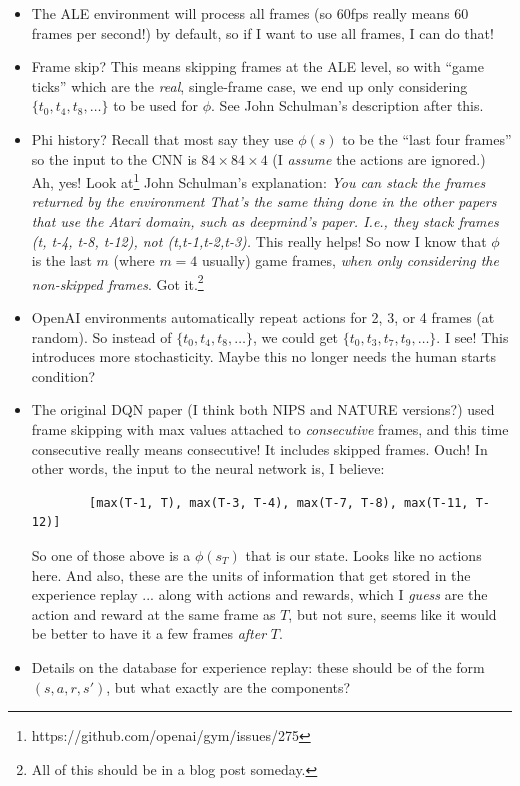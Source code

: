 \documentclass[letterpaper, 10pt, conference]{ieeeconf}
\begin{document}
    \begin{itemize}
        \item The ALE environment will process all frames (so 60fps really means
        60 frames per second!) by default, so if I want to use all frames, I can
        do that!

        \item Frame skip? This means skipping frames at the ALE level, so with
        ``game ticks'' which are the \emph{real}, single-frame case, we end up
        only considering $\{t_0, t_4, t_8, \ldots \}$ to be used for $\phi$. See
        John Schulman's description after this.

        \item Phi history? Recall that most say they use $\phi(s)$ to be the
        ``last four frames'' so the input to the CNN is $84 \times 84 \times 4$
        (I \emph{assume} the actions are ignored.) Ah, yes! Look
        at\footnote{https://github.com/openai/gym/issues/275} John
        Schulman's explanation: \emph{You can stack the frames returned by the
        environment That's the same thing done in the other papers that use the
        Atari domain, such as deepmind's paper.  I.e., they stack frames (t,
        t-4, t-8, t-12), not (t,t-1,t-2,t-3).} This really helps! So now I know
        that $\phi$ is the last $m$ (where $m=4$ usually) game frames,
        \emph{when only considering the non-skipped frames}. Got
        it.\footnote{All of this should be in a blog post someday.}

        \item OpenAI environments automatically repeat actions for 2, 3, or 4
        frames (at random). So instead of $\{t_0,t_4,t_8,\ldots\}$, we could get
        $\{t_0,t_3,t_7,t_9,\ldots\}$. I see! This introduces more stochasticity.
        Maybe this no longer needs the human starts condition?

        \item The original DQN paper (I think both NIPS and NATURE versions?)
        used frame skipping with max values attached to \emph{consecutive}
        frames, and this time consecutive really means consecutive! It includes
        skipped frames. Ouch! In other words, the input to the neural network
        is, I believe:
        \begin{verbatim}
        [max(T-1, T), max(T-3, T-4), max(T-7, T-8), max(T-11, T-12)]
        \end{verbatim}
        So one of those above is a $\phi(s_T)$ that is our state. Looks like no
        actions here. And also, these are the units of information that get
        stored in the experience replay ... along with actions and rewards,
        which I \emph{guess} are the action and reward at the same frame as $T$,
        but not sure, seems like it would be better to have it a few frames
        \emph{after} $T$.

        \item Details on the database for experience replay: these should be of
        the form $(s,a,r,s')$, but what exactly are the components?
    \end{itemize}
\end{document}
